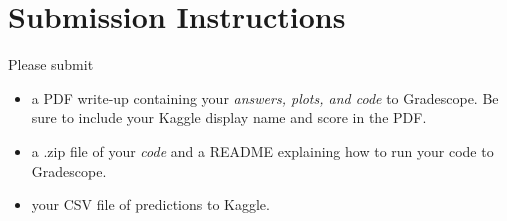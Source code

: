 \documentclass[section]{problemset}
\begin{document}
\newpage


\section*{Submission Instructions}
Please submit
\begin{itemize}
\item a PDF write-up containing your \textit{answers, plots, and code} to Gradescope. Be sure to include your Kaggle display name and score in the PDF.
\item a .zip file of your \textit{code} and a README explaining how to run your code to Gradescope.
\item your CSV file of predictions to Kaggle.
\end{itemize}
\end{document}
